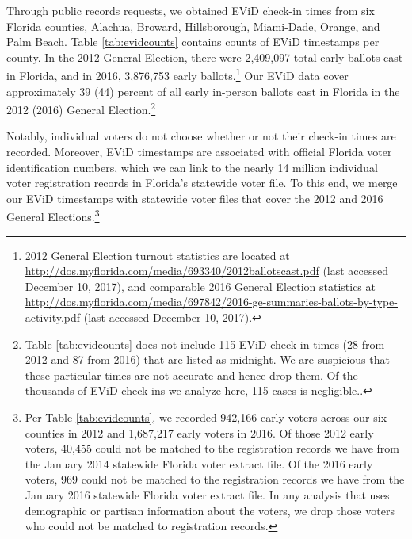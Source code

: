 \documentclass[12pt,titlepage]{article}
\begin{document}
Through public records requests, we obtained EViD check-in times from
six Florida counties, Alachua, Broward, Hillsborough, Miami-Dade,
Orange, and Palm Beach. Table \ref{tab:evidcounts} contains counts of
EViD timestamps per county. In the 2012 General Election, there were
2,409,097 total early ballots cast in Florida, and in 2016, 3,876,753
early ballots.\footnote{2012 General Election turnout
  statistics are located at
  \url{http://dos.myflorida.com/media/693340/2012ballotscast.pdf}
  (last accessed December 10, 2017), and comparable 2016 General
  Election statistics at
  \url{http://dos.myflorida.com/media/697842/2016-ge-summaries-ballots-by-type-activity.pdf}
  (last accessed December 10, 2017).} Our EViD data cover
approximately 39 (44) percent of all early in-person ballots cast in
Florida in the 2012 (2016) General Election.\footnote{Table
  \ref{tab:evidcounts} does
  not include 115 EViD check-in times (28 from 2012 and 87 from 2016)
  that are listed as midnight.  We are suspicious that these
  particular times are not accurate and hence drop them. Of the
  thousands of EViD   check-ins we analyze here, 115 cases is
  negligible.\label{fn:midnight}.}





Notably, individual voters do not choose whether or not their check-in
times are recorded. Moreover, EViD timestamps are associated with
official Florida voter identification numbers, which we can link to
the nearly 14 million individual voter registration records in
Florida's statewide voter file. To this end, we merge our EViD
timestamps with statewide voter files that cover the 2012 and 2016
General Elections.\footnote{Per Table
  \ref{tab:evidcounts}, we recorded 942,166 early voters across our
  six counties in 2012 and 1,687,217 early voters in 2016.  Of those
  2012 early voters, 40,455 could not be matched to the registration
  records we have from the January 2014 statewide Florida voter
  extract file.  Of the 2016 early voters, 969 could not be matched to
  the registration records we have from the January 2016 statewide
  Florida voter extract file.  In any analysis that uses demographic
  or partisan information about the voters, we drop those voters who
  could not be matched to registration records.}

\end{document}
